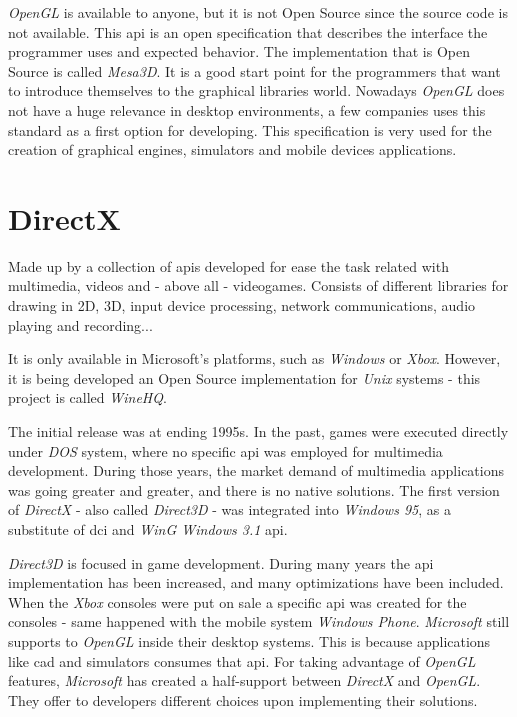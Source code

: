 \emph{OpenGL} is available to anyone, but it is not Open Source since the source code is not available. This
\gls{api} is an open specification that describes the interface the programmer uses and expected behavior. The
implementation that is Open Source is called \emph{Mesa3D}. It is a good start point for the programmers that want to
introduce themselves to the graphical libraries world. Nowadays \emph{OpenGL} does not have a huge relevance in
desktop environments, a few companies uses this standard as a first option for developing. This specification is very
used for the creation of graphical engines, simulators and mobile devices applications.

\section{DirectX}
Made up by a collection of \gls{api}s developed for ease the task related with multimedia, videos and - above all -
videogames. Consists of different libraries for drawing in 2D, 3D, input device processing, network communications,
audio playing and recording...

It is only available in Microsoft's platforms, such as \emph{Windows} or \emph{Xbox}. However, it is being developed an
Open Source implementation for \emph{Unix} systems - this project is called \emph{WineHQ}.

The initial release was at ending 1995s. In the past, games were executed directly under \emph{DOS} system, where no
specific \gls{api} was employed for multimedia development. During those years, the market demand of multimedia
applications was going greater and greater, and there is no native solutions. The first version of \emph{DirectX} - also
called \emph{Direct3D} - was integrated into \emph{Windows 95}, as a substitute of \gls{dci} and \emph{WinG Windows 3.1}
\gls{api}.

\emph{Direct3D} is focused in game development. During many years the \gls{api} implementation has been increased, and
many optimizations have been included. When the \emph{Xbox} consoles were put on sale a specific \gls{api} was created
for the consoles - same happened with the mobile system\emph{ Windows Phone}. \emph{Microsoft} still supports to
\emph{OpenGL} inside their desktop systems. This is because applications like \gls{cad} and simulators consumes that
\gls{api}. For taking advantage of \emph{OpenGL} features, \emph{Microsoft} has created a half-support between
\emph{DirectX} and \emph{OpenGL}. They offer to developers different choices upon implementing their solutions.
